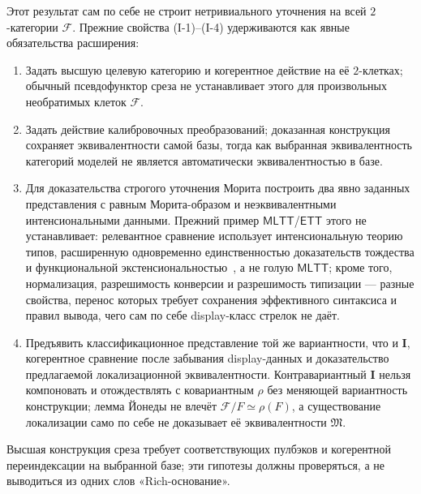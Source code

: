 \documentclass[11pt]{article}
\theoremstyle{plain}
\theoremstyle{definition}
\newcommand{\cF}{\mathcal{F}}
\newcommand{\fM}{\mathfrak{M}}
\newcommand{\MLTT}{\mathsf{MLTT}}
\newcommand{\ETT}{\mathsf{ETT}}
\newcommand{\II}{\mathbf{I}}
\begin{document}
Этот результат сам по себе не строит нетривиального уточнения на всей $2$-категории $\cF$. Прежние свойства (I-1)--(I-4) удерживаются как явные обязательства расширения:
\begin{enumerate}
\item[\textbf{(I-1)}] Задать высшую целевую категорию и когерентное действие на её $2$-клетках; обычный псевдофунктор среза не устанавливает этого для произвольных необратимых клеток $\cF$.
\item[\textbf{(I-2)}] Задать действие калибровочных преобразований; доказанная конструкция сохраняет эквивалентности самой базы, тогда как выбранная эквивалентность категорий моделей не является автоматически эквивалентностью в базе.
\item[\textbf{(I-3)}] Для доказательства строгого уточнения Морита построить два явно заданных представления с равным Морита-образом и неэквивалентными интенсиональными данными. Прежний пример $\MLTT$/$\ETT$ этого не устанавливает: релевантное сравнение использует интенсиональную теорию типов, расширенную одновременно единственностью доказательств тождества и функциональной экстенсиональностью~\cite{KapulkinLi2025}, а не голую $\MLTT$; кроме того, нормализация, разрешимость конверсии и разрешимость типизации — разные свойства, перенос которых требует сохранения эффективного синтаксиса и правил вывода, чего сам по себе display-класс стрелок не даёт.
\item[\textbf{(I-4)}] Предъявить классификационное представление той же вариантности, что и $\II$, когерентное сравнение после забывания display-данных и доказательство предлагаемой локализационной эквивалентности. Контравариантный $\II$ нельзя компоновать и отождествлять с ковариантным $\rho$ без меняющей вариантность конструкции; лемма Йонеды не влечёт $\cF / F \simeq \rho(F)$, а существование локализации само по себе не доказывает её эквивалентности $\fM$.
\end{enumerate}
Высшая конструкция среза требует соответствующих пулбэков и когерентной переиндексации на выбранной базе; эти гипотезы должны проверяться, а не выводиться из одних слов «Rich-основание».
\end{document}
